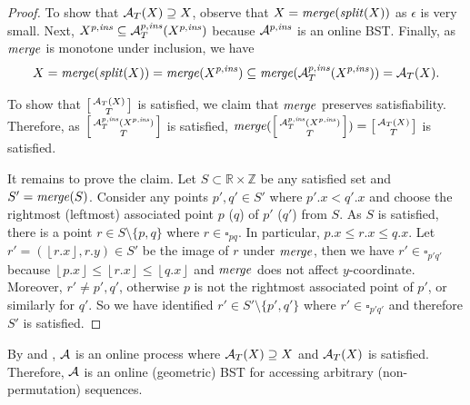 \begin{proof}
	To show that $\cA{}_{T}(X)\supseteq X$, observe that $X=\merge(\Split(X))$
	as $\epsilon$ is very small. Next, $X^{p,\mathit{ins}} \subseteq{\cal A}_{T}^{ p,\mathit{ins} }( X^{p,\mathit{ins}} )$
	because $\cA^{p,\mathit{ins}}$ is an online BST. Finally, as $\merge$ is monotone
	under inclusion, we have
	\[
	X=\merge(\Split(X)) = \merge( X^{p,\mathit{ins}} ) \subseteq\merge(\cA_{T}^{p,\mathit{ins}}( X^{p,\mathit{ins}} ))=\cA{}_{T}(X).
	\]
	
	
	To show that $\left[\begin{smallmatrix}
	\cA{}_{T}(X)\\
	T
	\end{smallmatrix}\right]$ is satisfied, we claim that $\merge$ preserves satisfiability. Therefore,
	as $\left[\begin{smallmatrix}
	\cA_{T}^{p,\mathit{ins}}( X^{p,\mathit{ins}} )\\
	T
	\end{smallmatrix}\right]$ is satisfied, $\merge(\left[\begin{smallmatrix}
	\cA_{T}^{p,\mathit{ins}}( X^{p,\mathit{ins}} )\\
	T
	\end{smallmatrix}\right])=\left[\begin{smallmatrix}
	\cA{}_{T}(X)\\
	T
	\end{smallmatrix}\right]$ is satisfied.
	
	It remains to prove the claim. Let $S\subset\mathbb{R}\times\mathbb{Z}$
	be any satisfied set and $S'=\merge(S)$. Consider any points $p',q'\in S'$
	where $p'.x<q'.x$ and choose the rightmost (leftmost) associated
	point $p$ ($q$) of $p'$ ($q'$) from $S$. As $S$ is satisfied,
	there is a point $r\in S\setminus\{p,q\}$ where $r\in\square_{pq}$.
	In particular, $p.x\le r.x\le q.x$. Let $r'=(\left\lfloor r.x\right\rfloor ,r.y)\in S'$
	be the image of $r$ under $\merge$, then we have $r'\in\square_{p'q'}$
	because $\left\lfloor p.x\right\rfloor \le\left\lfloor r.x\right\rfloor \le\left\lfloor q.x\right\rfloor $
	and $\merge$ does not affect $y$-coordinate. Moreover, $r'\neq p',q'$,
	otherwise $p$ is not the rightmost associated point of $p'$, or
	similarly for $q'$. So we have identified $r'\in S'\setminus\{p',q'\}$
	where $r'\in\square_{p'q'}$ and therefore $S'$ is satisfied.
\end{proof}
By  and , ${\cal A}$ is an online
process where $\cA{}_{T}(X)\supseteq X$ and $\cA{}_{T}(X)$ is satisfied.
Therefore, ${\cal A}$ is an online (geometric) BST for accessing arbitrary (non-permutation) sequences.

